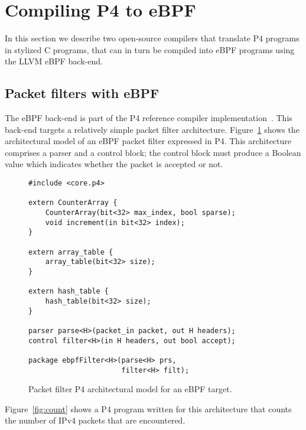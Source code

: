 \section{Compiling P4 to eBPF}\label{sec:compilation}

In this section we describe two open-source compilers that translate
P4 programs in stylized C programs, that can in turn be compiled into
eBPF programs using the LLVM eBPF back-end.

\subsection{Packet filters with eBPF}\label{sec:ebpf}

The eBPF back-end is part of the P4 reference compiler
implementation~\cite{p4-ebpf-backend}.  This back-end targets a
relatively simple packet filter architecture.
Figure~\ref{fig:ebpf-model} shows the architectural model of an eBPF
packet filter expressed in P4.  This architecture comprises a parser
and a control block; the control block must produce a Boolean value
which indicates whether the packet is accepted or not.

\begin{figure}[h]
\begin{lstlisting}
#include <core.p4>

extern CounterArray {
    CounterArray(bit<32> max_index, bool sparse);
    void increment(in bit<32> index);
}

extern array_table {
    array_table(bit<32> size);
}

extern hash_table {
    hash_table(bit<32> size);
}

parser parse<H>(packet_in packet, out H headers);
control filter<H>(in H headers, out bool accept);

package ebpfFilter<H>(parse<H> prs,
                      filter<H> filt);
\end{lstlisting}
\caption{Packet filter P4 architectural model for an eBPF
  target.}\label{fig:ebpf-model}
\end{figure}

Figure~\ref{fig:count} shows a P4 program written for this
architecture that counts the number of IPv4 packets that are
encountered.

